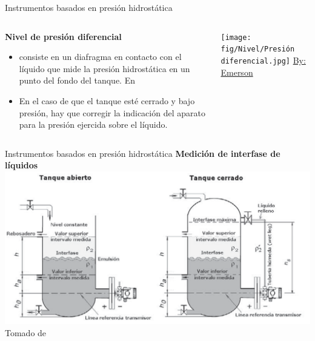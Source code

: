 \documentclass[aspectratio=169]{beamer}
\begin{document}
\begin{frame}{Instrumentos basados en presión hidrostática}
    \begin{columns}[c, onlytextwidth]
        \begin{column}{0.45\textwidth}
        \textbf{Nivel de presión diferencial}
            \begin{itemize}
                \item consiste en un diafragma en contacto con el líquido que mide la presión hidrostática en un punto del fondo del tanque. En 
                \item En el caso de que el tanque esté cerrado y bajo presión, hay que corregir la indicación del aparato para la presión ejercida sobre el líquido.
            \end{itemize}
        \end{column}
        \begin{column}{0.50\textwidth}
            \texttt{[image: fig/Nivel/Presión diferencial.jpg]}           \tiny{\href{https://www.emerson.com/es-es/automation/measurement-instrumentation/pressure-measurement/about-differential-pressure-dp-level-measurement}{By: Emerson}}
           
        \end{column}
    \end{columns}
\end{frame}

\begin{frame}{Instrumentos basados en presión hidrostática}
    \textbf{Medición de interfase de líquidos}
    \centering
    \includegraphics[width = 0.8\linewidth]{fig/Nivel/Interfaz.PNG}\\
            \tiny{Tomado de \cite{sole2005instrumentacion}}
\end{frame}
\end{document}
